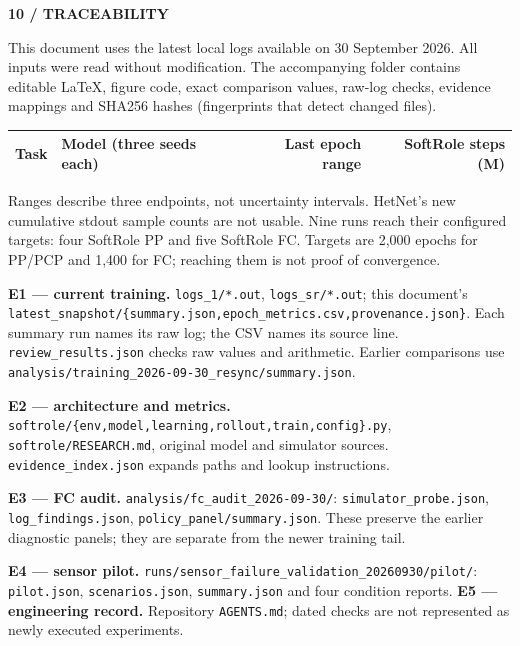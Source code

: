 \documentclass[11pt,letterpaper]{article}
\newcommand{\eyebrow}[1]{{\small\bfseries\color{teal}#1}\par\vspace{3pt}}
\newcommand{\pagetitle}[2]{\eyebrow{#1}{\fontsize{25}{28}\selectfont\bfseries #2\par}\vspace{7pt}}
\newcommand{\sub}[1]{\par\vspace{5pt}{\large\bfseries #1}\par\vspace{1pt}}
\newcommand{\captiontext}[1]{\par{\fontsize{9}{11}\selectfont\color{muted}#1\par}}
\newcommand{\code}[1]{\nolinkurl{#1}}
\begin{document}
\newpage
\pagetitle{10 / TRACEABILITY}{How to check every result}
This document uses the latest local logs available on 30 September 2026. All inputs were read without modification. The accompanying folder contains editable LaTeX, figure code, exact comparison values, raw-log checks, evidence mappings and SHA256 hashes (fingerprints that detect changed files).

\sub{Snapshot coverage}
{\small\renewcommand{\arraystretch}{1.05}\begin{tabularx}{\linewidth}{@{}lXrr@{}}\toprule
Task & Model (three seeds each) & Last epoch range & SoftRole steps (M) \\\midrule
\bottomrule
\end{tabularx}}
\captiontext{Ranges describe three endpoints, not uncertainty intervals. HetNet's new cumulative stdout sample counts are not usable. Nine runs reach their configured targets: four SoftRole PP and five SoftRole FC. Targets are 2,000 epochs for PP/PCP and 1,400 for FC; reaching them is not proof of convergence.}

\sub{Local evidence map}
{\fontsize{9}{11}\selectfont
\textbf{E1 --- current training.} \code{logs_1/*.out}, \code{logs_sr/*.out}; this document's \code{latest_snapshot/{summary.json,epoch_metrics.csv,provenance.json}}. Each summary run names its raw log; the CSV names its source line. \code{review_results.json} checks raw values and arithmetic. Earlier comparisons use \code{analysis/training_2026-09-30_resync/summary.json}.

\textbf{E2 --- architecture and metrics.} \code{softrole/{env,model,learning,rollout,train,config}.py}, \code{softrole/RESEARCH.md}, original model and simulator sources. \code{evidence_index.json} expands paths and lookup instructions.

\textbf{E3 --- FC audit.} \code{analysis/fc_audit_2026-09-30/}: \code{simulator_probe.json}, \code{log_findings.json}, \code{policy_panel/summary.json}. These preserve the earlier diagnostic panels; they are separate from the newer training tail.

\textbf{E4 --- sensor pilot.} \code{runs/sensor_failure_validation_20260930/pilot/}: \code{pilot.json}, \code{scenarios.json}, \code{summary.json} and four condition reports. \textbf{E5 --- engineering record.} Repository \code{AGENTS.md}; dated checks are not represented as newly executed experiments.
}
\end{document}
